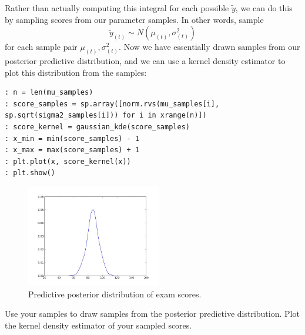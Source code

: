 Rather than actually computing this integral for each possible $\tilde{y}$, we can do this by sampling scores from our parameter samples. In other words, sample $$\tilde{y}_{(t)} \sim N(\mu_{(t)}, \sigma_{(t)}^{2})$$ for each sample pair $\mu_{(t)}, \sigma_{(t)}^{2}$. Now we have essentially drawn samples from our posterior predictive distribution, and we can use a kernel density estimator to plot this distribution from the samples:

\begin{lstlisting}[style=python]
: n = len(mu_samples)
: score_samples = sp.array([norm.rvs(mu_samples[i], sp.sqrt(sigma2_samples[i])) for i in xrange(n)])
: score_kernel = gaussian_kde(score_samples)
: x_min = min(score_samples) - 1
: x_max = max(score_samples) + 1
: plt.plot(x, score_kernel(x))
: plt.show()
\end{lstlisting}

\begin{figure}
\begin{center}
\includegraphics[height=1.75in]{predictiveposterior.jpeg}
\end{center}
\caption{Predictive posterior distribution of exam scores.}
\end{figure}

\begin{problem}
Use your samples to draw samples from the posterior predictive distribution. Plot the kernel density estimator of your sampled scores.
\end{problem}